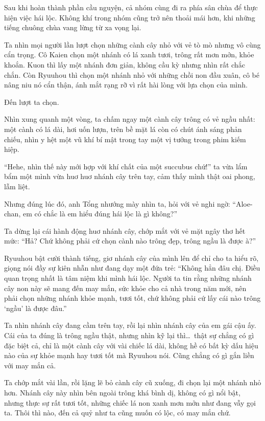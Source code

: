 \documentclass[../main.tex]{subfiles}
\begin{document}
\ct

Sau khi hoàn thành phần cầu nguyện, cả nhóm cùng đi ra phía sân chùa để thực hiện việc hái lộc. Không khí trong nhóm cũng trở nên thoải mái hơn, khi những tiếng chuông chùa vang lừng từ xa vọng lại.

Ta nhìn mọi người lần lượt chọn những cành cây nhỏ với vẻ tò mò nhưng vô cùng cẩn trọng. Cô Kaien chọn một nhánh có lá xanh tươi, trông rất mơn mởn, khỏe khoắn. Kuon thì lấy một nhánh đơn giản, không cầu kỳ nhưng nhìn rất chắc chắn. Còn Ryuuhou thì chọn một nhánh nhỏ với những chồi non đầu xuân, cô bé nâng niu nó cẩn thận, ánh mắt rạng rỡ vì rất hài lòng với lựa chọn của mình.

Đến lượt ta chọn.

Nhìn xung quanh một vòng, ta chấm ngay một cành cây trông có vẻ ngầu nhất: một cành có lá dài, hơi uốn lượn, trên bề mặt lá còn có chút ánh sáng phản chiếu, nhìn y hệt một vũ khí bí mật trong tay một vị tướng trong phim kiếm hiệp.

``Hehe, nhìn thế này mới hợp với khí chất của một succubus chứ!'' ta vừa lẩm bẩm một mình vừa huơ huơ nhánh cây trên tay, cảm thấy mình thật oai phong, lẫm liệt.

Nhưng đúng lúc đó, anh Tổng nhướng mày nhìn ta, hỏi với vẻ nghi ngờ: ``Aloe-chan, em có chắc là em hiểu đúng hái lộc là gì không?''

Ta dừng lại cái hành động huơ nhánh cây, chớp mắt với vẻ mặt ngây thơ hết mức: ``Hả? Chứ không phải cứ chọn cành nào trông đẹp, trông ngầu là được à?''

Ryuuhou bật cười thành tiếng, giơ nhánh cây của mình lên để chỉ cho ta hiểu rõ, giọng nói đầy sự kiên nhẫn như đang dạy một đứa trẻ: ``Không hẳn đâu chị. Điều quan trọng nhất là tâm niệm khi mình hái lộc. Người ta tin rằng những nhánh cây non này sẽ mang đến may mắn, sức khỏe cho cả nhà trong năm mới, nên phải chọn những nhánh khỏe mạnh, tươi tốt, chứ không phải cứ lấy cái nào trông `ngầu' là được đâu.''

Ta nhìn nhánh cây đang cầm trên tay, rồi lại nhìn nhánh cây của em gái cậu ấy. Cái của ta đúng là trông ngầu thật, nhưng nhìn kỹ lại thì\dots\ thật sự chẳng có gì đặc biệt cả, chỉ là một cành cây với vài chiếc lá dài, không hề có bất kỳ dấu hiệu nào của sự khỏe mạnh hay tươi tốt mà Ryuuhou nói. Cũng chẳng có gì gắn liền với may mắn cả.

Ta chớp mắt vài lần, rồi lặng lẽ bỏ cành cây cũ xuống, đi chọn lại một nhánh nhỏ hơn. Nhánh cây này nhìn bên ngoài trông khá bình dị, không có gì nổi bật, nhưng thực sự rất tươi tốt, những chiếc lá non xanh mơn mởn như đang vẫy gọi ta. Thôi thì nào, đến cả quỷ như ta cũng muốn có lộc, có may mắn chứ.
\end{document}
